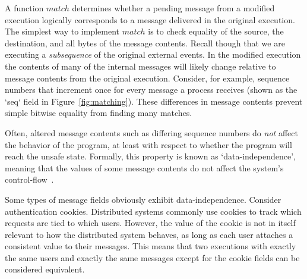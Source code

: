  A function $match$ determines whether a
pending message from a modified execution logically corresponds to a
message delivered in the original execution. The simplest way to implement
$match$ is to
check equality of the source, the destination, and all bytes of the message
contents. Recall though that we are executing a
{\em subsequence} of the original external events.
In the modified execution the contents of many of the
internal messages will likely change relative to message contents from the original execution. Consider, for example, sequence numbers
that increment once for every message a process receives (shown as the `seq` field in Figure~\ref{fig:matching}). These differences in
message contents prevent simple bitwise equality from finding
many matches.

 Often, altered message
contents such as differing sequence numbers do {\em not} affect the behavior of the
program, at least with respect to whether the program will reach the
unsafe state. Formally, this property is known as
`data-independence', meaning that the values of some message contents
do not affect the system's control-flow~\cite{shacham2014verifying,wolper}.

Some types of message fields obviously exhibit
data-independence. Consider authentication cookies. Distributed systems commonly
use cookies to track which requests are tied to which users. However, the
value of the cookie is not in itself relevant to how the distributed system
behaves, as long as each user attaches a consistent value to their messages. This means that two executions
with exactly the same users and exactly the same messages except for the
cookie fields can be considered equivalent.

